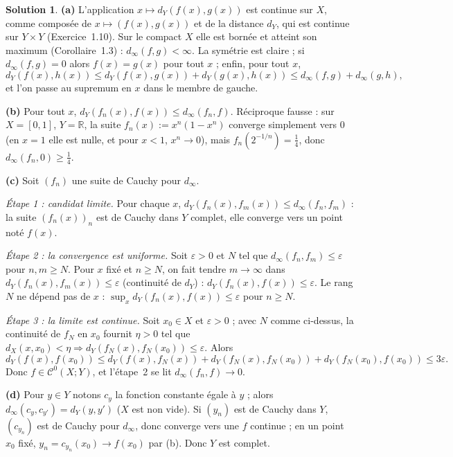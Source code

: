 \documentclass[11pt,a4paper]{article}
\newcommand{\R}{\mathbb{R}}
\newcommand{\Cz}{\mathcal{C}^0}
\theoremstyle{definition}
\newtheorem*{solution}{Solution}
\begin{document}
\begin{solution}
\noindent\textbf{(a)} L'application $x\mapsto d_Y(f(x),g(x))$ est continue sur $X$, comme composée de $x\mapsto(f(x),g(x))$ et de la distance $d_Y$, qui est continue sur $Y\times Y$ (Exercice~1.10). Sur le compact $X$ elle est bornée et atteint son maximum (Corollaire~1.3) : $d_\infty(f,g)<\infty$. La symétrie est claire ; si $d_\infty(f,g)=0$ alors $f(x)=g(x)$ pour tout $x$ ; enfin, pour tout $x$,
\[
d_Y(f(x),h(x))\le d_Y(f(x),g(x))+d_Y(g(x),h(x))\le d_\infty(f,g)+d_\infty(g,h),
\]
et l'on passe au supremum en $x$ dans le membre de gauche.

\medskip
\noindent\textbf{(b)} Pour tout $x$, $d_Y(f_n(x),f(x))\le d_\infty(f_n,f)$. Réciproque fausse : sur $X=[0,1]$, $Y=\R$, la suite $f_n(x):=x^n(1-x^n)$ converge simplement vers $0$ (en $x=1$ elle est nulle, et pour $x<1$, $x^n\to0$), mais $f_n(2^{-1/n})=\frac14$, donc $d_\infty(f_n,0)\ge\frac14$.

\medskip
\noindent\textbf{(c)} Soit $(f_n)$ une suite de Cauchy pour $d_\infty$.

\emph{Étape 1 : candidat limite.} Pour chaque $x$, $d_Y(f_n(x),f_m(x))\le d_\infty(f_n,f_m)$ : la suite $(f_n(x))_n$ est de Cauchy dans $Y$ complet, elle converge vers un point noté $f(x)$.

\emph{Étape 2 : la convergence est uniforme.} Soit $\varepsilon>0$ et $N$ tel que $d_\infty(f_n,f_m)\le\varepsilon$ pour $n,m\ge N$. Pour $x$ fixé et $n\ge N$, on fait tendre $m\to\infty$ dans $d_Y(f_n(x),f_m(x))\le\varepsilon$ (continuité de $d_Y$) : $d_Y(f_n(x),f(x))\le\varepsilon$. Le rang $N$ ne dépend pas de $x$ : $\sup_xd_Y(f_n(x),f(x))\le\varepsilon$ pour $n\ge N$.

\emph{Étape 3 : la limite est continue.} Soit $x_0\in X$ et $\varepsilon>0$ ; avec $N$ comme ci-dessus, la continuité de $f_N$ en $x_0$ fournit $\eta>0$ tel que $d_X(x,x_0)<\eta\Rightarrow d_Y(f_N(x),f_N(x_0))\le\varepsilon$. Alors
\[
d_Y(f(x),f(x_0))\le d_Y(f(x),f_N(x))+d_Y(f_N(x),f_N(x_0))+d_Y(f_N(x_0),f(x_0))\le3\varepsilon .
\]
Donc $f\in\Cz(X;Y)$, et l'étape~2 se lit $d_\infty(f_n,f)\to0$.

\medskip
\noindent\textbf{(d)} Pour $y\in Y$ notons $c_y$ la fonction constante égale à $y$ ; alors $d_\infty(c_y,c_{y'})=d_Y(y,y')$ ($X$ est non vide). Si $(y_n)$ est de Cauchy dans $Y$, $(c_{y_n})$ est de Cauchy pour $d_\infty$, donc converge vers une $f$ continue ; en un point $x_0$ fixé, $y_n=c_{y_n}(x_0)\to f(x_0)$ par (b). Donc $Y$ est complet.
\end{solution}
\end{document}
